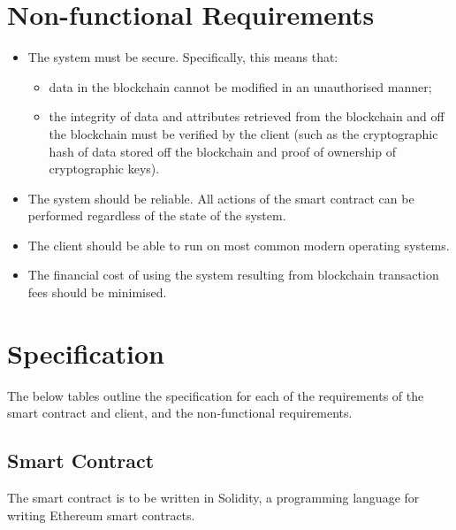 \documentclass[12pt,a4paper]{report}
\begin{document}
	\section{Non-functional Requirements}
	\begin{itemize}
		\item The system must be secure. Specifically, this means that:
			\begin{itemize}
				\item data in the blockchain cannot be modified in an unauthorised manner;
				\item the integrity of data and attributes retrieved from the blockchain and off the blockchain must be verified by the client (such as the cryptographic hash of data stored off the blockchain and proof of ownership of cryptographic keys).
			\end{itemize}
		\item The system should be reliable. All actions of the smart contract can be performed regardless of the state of the system.
		\item The client should be able to run on most common modern operating systems.
		\item The financial cost of using the system resulting from blockchain transaction fees should be minimised.
	\end{itemize}
	
	\section{Specification}
	The below tables outline the specification for each of the requirements of the smart contract and client, and the non-functional requirements.	
	
	\subsection{Smart Contract}
	The smart contract is to be written in Solidity, a programming language for writing Ethereum smart contracts.
	
\end{document}
